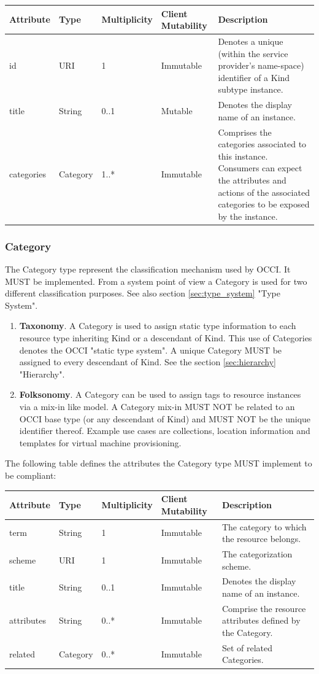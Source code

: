 \documentclass[10pt,a4paper]{article}
\begin{document}
\begin{tabular}{l|l|l|l|p{2.7in}}
Attribute & Type & Multiplicity & Client Mutability & Description \\
\hline
id & URI & 1 & Immutable & Denotes a unique (within the service provider's name-space) identifier of a Kind subtype instance. \\
title & String & 0..1 & Mutable & Denotes the display name of an instance. \\
categories & Category & 1..* & Immutable & Comprises the categories associated to this instance. Consumers can expect the attributes and actions of the associated categories to be exposed by the instance. \\
\end{tabular}

\subsubsection{Category}
The Category type represent the classification mechanism used by OCCI. It MUST be implemented. From a system point of view a Category is used for two different classification purposes. See also section \ref{sec:type_system} "Type System".

\begin{enumerate}
	\item \textbf{Taxonomy}. A Category is used to assign static type information to each resource type inheriting Kind or a descendant of Kind. This use of Categories denotes the OCCI "static type system". A unique Category MUST be assigned to every descendant of Kind. See the section \ref{sec:hierarchy} "Hierarchy".
	\item \textbf{Folksonomy}. A Category can be used to assign tags to resource instances via a mix-in like model. A Category mix-in MUST NOT be related to an OCCI base type (or any descendant of Kind) and MUST NOT be the unique identifier thereof. Example use cases are collections, location information and templates for virtual machine provisioning.
\end{enumerate}

The following table defines the attributes the Category type MUST implement to be compliant:

\begin{tabular}{l|l|l|l|p{2.7in}}
Attribute & Type & Multiplicity & Client Mutability & Description \\
\hline
term & String & 1 & Immutable & The category to which the resource belongs. \\
scheme & URI & 1 & Immutable & The categorization scheme. \\
title & String & 0..1 & Immutable & Denotes the display name of an instance. \\
attributes & String & 0..* & Immutable & Comprise the resource attributes defined by the Category. \\
related & Category & 0..* & Immutable & Set of related Categories. \\
\end{tabular}
\end{document}
